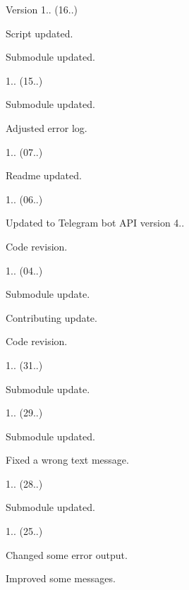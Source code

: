 \begin{DoxyVersion}{Version}
1.. (16..)
\begin{DoxyItemize}
\item Script updated.
\item Submodule updated. 
\end{DoxyItemize}

1.. (15..)
\begin{DoxyItemize}
\item Submodule updated.
\item Adjusted error log. 
\end{DoxyItemize}

1.. (07..)
\begin{DoxyItemize}
\item Readme updated. 
\end{DoxyItemize}

1.. (06..)
\begin{DoxyItemize}
\item Updated to Telegram bot A\+PI version 4..
\item Code revision. 
\end{DoxyItemize}

1.. (04..)
\begin{DoxyItemize}
\item Submodule update.
\item Contributing update.
\item Code revision. 
\end{DoxyItemize}

1.. (31..)
\begin{DoxyItemize}
\item Submodule update. 
\end{DoxyItemize}

1.. (29..)
\begin{DoxyItemize}
\item Submodule updated.
\item Fixed a wrong text message. 
\end{DoxyItemize}

1.. (28..)
\begin{DoxyItemize}
\item Submodule updated. 
\end{DoxyItemize}

1.. (25..)
\begin{DoxyItemize}
\item Changed some error output.
\item Improved some messages. 
\end{DoxyItemize}


\end{DoxyVersion}
